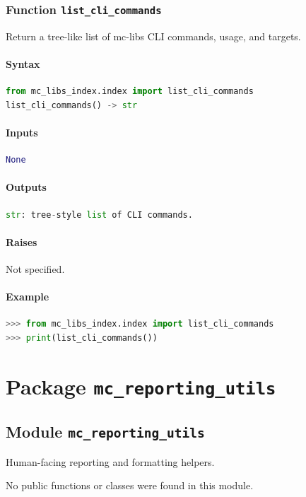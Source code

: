 \documentclass[11pt]{article}
\begin{document}
\subsubsection{Function \texttt{list\_cli\_commands}}
Return a tree-like list of mc-libs CLI commands, usage, and targets.

\paragraph{Syntax}
\begin{lstlisting}[language=Python]
from mc_libs_index.index import list_cli_commands
list_cli_commands() -> str
\end{lstlisting}
\paragraph{Inputs}
\begin{lstlisting}[language=Python]
None
\end{lstlisting}
\paragraph{Outputs}
\begin{lstlisting}[language=Python]
str: tree-style list of CLI commands.
\end{lstlisting}
\paragraph{Raises}
Not specified.
\paragraph{Example}
\begin{lstlisting}[language=Python]
>>> from mc_libs_index.index import list_cli_commands
>>> print(list_cli_commands())
\end{lstlisting}


\section{Package \texttt{mc\_reporting\_utils}}
\subsection{Module \texttt{mc\_reporting\_utils}}
Human-facing reporting and formatting helpers.

No public functions or classes were found in this module.
\end{document}
